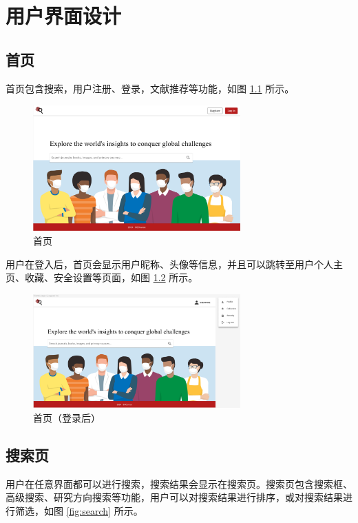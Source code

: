 \documentclass[UTF8,openany]{ctexbook}
\begin{document}
\chapter{用户界面设计}

\section{首页}

首页包含搜索，用户注册、登录，文献推荐等功能，如图 \ref{fig:home} 所示。

\begin{figure}[H]
\centering
\includegraphics[width=0.71\textwidth]{img/1.png}
\caption{首页}
\label{fig:home}
\end{figure}

用户在登入后，首页会显示用户昵称、头像等信息，并且可以跳转至用户个人主页、收藏、安全设置等页面，如图 \ref{fig:home-login} 所示。

\begin{figure}[H]
\centering
\includegraphics[width=0.71\textwidth]{img/2.png}
\caption{首页（登录后）}
\label{fig:home-login}
\end{figure}

\section{搜索页}

用户在任意界面都可以进行搜索，搜索结果会显示在搜索页。搜索页包含搜索框、高级搜索、研究方向搜索等功能，用户可以对搜索结果进行排序，或对搜索结果进行筛选，如图 \ref{fig:search} 所示。
\end{document}

